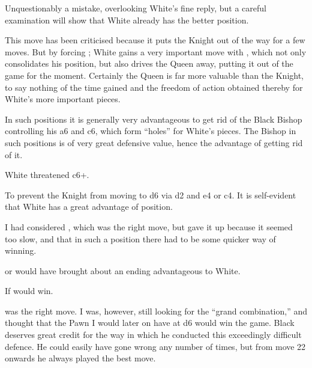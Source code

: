 \documentclass[10pt,twoside]{article}
\begin{document}
Unquestionably a mistake, overlooking White's fine reply, but a careful examination will show that White already has the better position.


\board


This move has been criticised because it puts the Knight out of the way for a few moves. But by forcing ; White gains a very important move with , which not only consolidates his position, but also drives the Queen away, putting it out of the game for the moment. Certainly the Queen is far more valuable than the Knight, to say nothing of the time gained and the freedom of action obtained thereby for White's more important pieces.


In such positions it is generally very advantageous to get rid of the Black Bishop controlling his a6 and c6, which form ``holes'' for White's pieces. The Bishop in such positions is of very great defensive value, hence the advantage of getting rid of it.


White threatened c6+.


To prevent the Knight from moving to d6 via d2 and e4 or c4. It is self-evident that White has a great advantage of position.

\board


I had considered , which was the right move, but gave it up because it seemed too slow, and that in such a position there had to be some quicker way of winning.


 or  would have brought about an ending advantageous to White.


If  would win.

\board


 was the right move. I was, however, still looking for the ``grand combination,'' and thought that the Pawn I would later on have at d6 would win the game. Black deserves great credit for the way in which he conducted this exceedingly difficult defence. He could easily have gone wrong any number of times, but from move 22 onwards he always played the best move.
\end{document}
